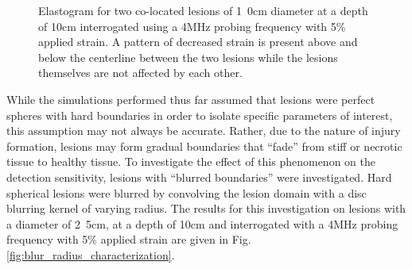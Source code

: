 			\begin{figure}[!t]
				\centering
				\caption{Elastogram for two co-located lesions of \unit{1.0}{cm} diameter at a depth of \unit{10}{cm} interrogated using a \unit{4}{MHz} probing frequency with \unit{5}{\%} applied strain. A pattern of decreased strain is present above and below the centerline between the two lesions while the lesions themselves are not affected by each other.}
				\label{fig:separation_elastogram}
			\end{figure}

			While the simulations performed thus far assumed that lesions were perfect spheres with hard boundaries in order to isolate specific parameters of interest, this assumption may not always be accurate. Rather, due to the nature of injury formation, lesions may form gradual boundaries that ``fade'' from stiff or necrotic tissue to healthy tissue. To investigate the effect of this phenomenon on the detection sensitivity, lesions with ``blurred boundaries'' were investigated. Hard spherical lesions were blurred by convolving the lesion domain with a disc blurring kernel of varying radius. The results for this investigation on lesions with a diameter of \unit{2.5}{cm}, at a depth of \unit{10}{cm} and interrogated with a \unit{4}{MHz} probing frequency with \unit{5}{\%} applied strain are given in Fig. \ref{fig:blur_radius_characterization}.

